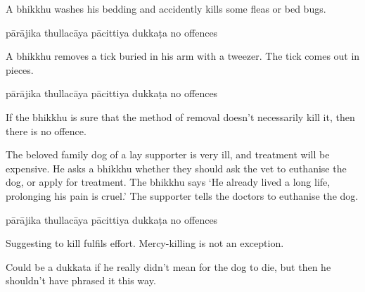\begin{exam}{\autoExamName}
\begin{problem*}
\begin{parts}
  \bigskip

  \item A bhikkhu washes his bedding and accidently kills some fleas or bed bugs.

  \bigskip

  \begin{answers}{5}
    \bChoices
     pārājika\eAns
     thullacāya\eAns
     pācittiya\eAns
     dukkaṭa\eAns
     no offences\eAns
    \eChoices
  \end{answers}

  \bigskip

  \item A bhikkhu removes a tick buried in his arm with a tweezer. The tick comes out in pieces.

  \bigskip

  \begin{answers}{5}
    \bChoices
     pārājika\eAns
     thullacāya\eAns
     pācittiya\eAns
     dukkaṭa\eAns
     no offences\eAns
    \eChoices
  \end{answers}

  \begin{solution}
    If the bhikkhu is sure that the method of removal doesn't necessarily kill
    it, then there is no offence.
  \end{solution}

  \bigskip

  \item The beloved family dog of a lay supporter is very ill, and treatment will
    be expensive. He asks a bhikkhu whether they should ask the vet to euthanise
    the dog, or apply for treatment. The bhikkhu says `He already lived a long
    life, prolonging his pain is cruel.' The supporter tells the doctors to
    euthanise the dog.

  \bigskip

  \begin{answers}{5}
    \bChoices
     pārājika\eAns
     thullacāya\eAns
     pācittiya\eAns
     dukkaṭa\eAns
     no offences\eAns
    \eChoices
  \end{answers}

  \begin{solution}
    Suggesting to kill fulfils effort. Mercy-killing is not an exception.

    Could be a dukkata if he really didn't mean for the dog to die, but then he
    shouldn't have phrased it this way.
  \end{solution}


\end{parts}
\end{problem*}
\end{exam}
